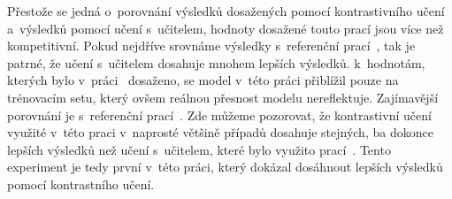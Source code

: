 \begin{table}[H]
    \centering
    \caption{Porovnání dosažených výsledků touto prací s~výsledky publikované v~referenčních pracích při učení s~učitelem.}
\end{table}

Přestože se jedná o~porovnání výsledků dosažených pomocí kontrastivního učení a~výsledků pomocí učení s~učitelem, hodnoty dosažené touto prací jsou více než kompetitivní. Pokud nejdříve srovnáme výsledky s~referenční prací~\cite{flowpic_augmentations}, tak je patrné, že učení s~učitelem dosahuje mnohem lepších výsledků. k~hodnotám, kterých bylo v~práci~\cite{flowpic_augmentations} dosaženo, se model v~této práci přiblížil pouze na trénovacím setu, který ovšem reálnou přesnost modelu nereflektuje. Zajímavější porovnání je s~referenční prací~\cite{huawei_paper}. Zde můžeme pozorovat, že kontrastivní učení využité v~této praci v~naprosté většině případů dosahuje stejných, ba dokonce lepších výsledků než učení s~učitelem, které bylo využito prací~\cite{huawei_paper}. Tento experiment je tedy první v~této práci, který dokázal dosáhnout lepších výsledků pomocí kontrastního učení.

